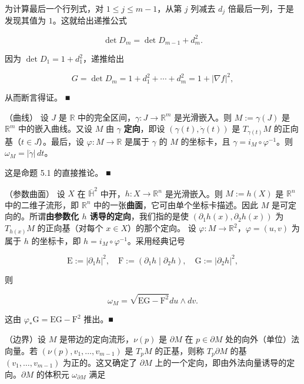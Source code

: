 \begin{example}
\begin{items}
为计算最后一个行列式，对 $ 1 \le j \le m-1 $，从第 $ j $ 列减去 $ d_j $ 倍最后一列，于是发现其值为 $ 1 $。这就给出递推公式

\[
\det D_m = \det D_{m-1} + d_m^2 .
\]

因为 $ \det D_1 = 1 + d_1^2 $，递推给出

\[
G = \det D_m = 1 + d_1^2 + \cdots + d_m^2 = 1 + |\nabla f|^2 ,
\]

从而断言得证。 \nobreak\hspace{0.35em}■

\item[（e）]

（曲线） 设 $ J $ 是 $ \mathbb{R} $ 中的完全区间，$ \gamma : J \to \mathbb{R}^m $ 是光滑嵌入。则 $ M := \gamma(J) $ 是 $ \mathbb{R}^m $ 中的嵌入曲线。又设 $ M $ 由 $ \gamma $ \textbf{定向}，即设 $ (\gamma(t), \dot{\gamma}(t)) $ 是 $ T_{\gamma(t)}M $ 的正向基（$ t \in J $）。最后，设 $ \varphi : M \to \mathbb{R} $ 是属于 $ \gamma $ 的 $ M $ 的坐标卡，且 $ \gamma = i_M \circ \varphi^{-1} $。则 $ \omega_M = |\dot{\gamma}|\, dt $。

\proofhead
这是命题 5.1 的直接推论。 \nobreak\hspace{0.35em}■
\item[（f）]

（参数曲面） 设 $ X $ 在 $ \overline{\mathbb{H}}^2 $ 中开，$ h : X \to \mathbb{R}^n $ 是光滑嵌入。则 $ M := h(X) $ 是 $ \mathbb{R}^n $ 中的二维子流形，即 $ \mathbb{R}^n $ 中的一张\textbf{曲面}，它可由单个坐标卡描述。因此 $ M $ 是可定向的。所谓\textbf{由参数化 $ h $ 诱导的定向}，我们指的是使 $ (\partial_1 h(x), \partial_2 h(x)) $ 为 $ T_{h(x)}M $ 的正向基（对每个 $ x \in X $）的那个定向。
设 $ \varphi: M \to \mathbb{R}^{2} $，$ \varphi = (u, v) $ 为属于 $ h $ 的坐标卡，即 $ h = i_{M} \circ \varphi^{-1} $。采用经典记号

\[
\mathrm{E} := |\partial_{1}h|^{2} , \quad \mathrm{F} := (\partial_{1}h \mid \partial_{2}h) , \quad \mathrm{G} := |\partial_{2}h|^{2} ,
\]

则

\[
\omega_{M} = \sqrt{\mathrm{EG} - \mathrm{F}^{2}} du \wedge dv .
\]

\proofhead
这由 $ \varphi_{*}\mathrm{G} = \mathrm{EG} - \mathrm{F}^{2} $ 推出。\nobreak\hspace{0.35em}■
\item[（g）]

（边界）设 $ M $ 是带边的定向流形，$ \nu(p) $ 是 $ \partial M $ 在 $ p \in \partial M $ 处的向外（单位）法向量。若 $ (\nu(p), v_{1}, \ldots, v_{m-1}) $ 是 $ T_{p}M $ 的正基，则称 $ T_{p}\partial M $ 的基 $ (v_{1}, \ldots, v_{m-1}) $ 为正的。这又确定了 $ \partial M $ 上的一个定向，即由外法向量诱导的定向。$ \partial M $ 的体积元 $ \omega_{\partial M} $ 满足


\end{items}
\end{example}
